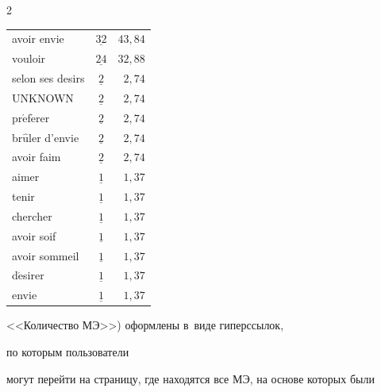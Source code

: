 \begin{multicols}{2}
{\begin{center}
\begin{tabular}{|l|c|r|}
avoir envie & $\underline{32}$ & ${43{,}84}$\\

vouloir & $\underline{24}$ & ${32{,}88}$\\

selon ses desirs & $\underline{2}$ & ${2{,}74}$\\

UNKNOWN & $\underline{2}$ & ${2{,}74}$\\

pr$\acute{\mbox{e}}$f$\acute{\mbox{e}}$rer & $\underline{2}$ & ${2{,}74}$\\

br$\hat{\mbox{u}}$ler d'envie & $\underline{2}$ & ${2{,}74}$\\

avoir faim & $\underline{2}$ & ${2{,}74}$\\

aimer & $\underline{1}$ & ${1{,}37}$\\

tenir & $\underline{1}$ & ${1{,}37}$\\

chercher & $\underline{1}$ & ${1{,}37}$\\

avoir soif & $\underline{1}$ & ${1{,}37}$\\

avoir sommeil & $\underline{1}$ & ${1{,}37}$\\

d$\acute{\mbox{e}}$sirer & $\underline{1}$ & ${1{,}37}$\\

envie & $\underline{1}$& ${1{,}37}$\\

\hline

\end{tabular}

\end{center}

}



\vspace*{12pt}









\noindent

<<Количество МЭ>>) оформлены в~виде гиперссылок,

 по которым пользователи 

могут перейти на страницу, где находятся все МЭ, на основе которых были 


\end{multicols}
